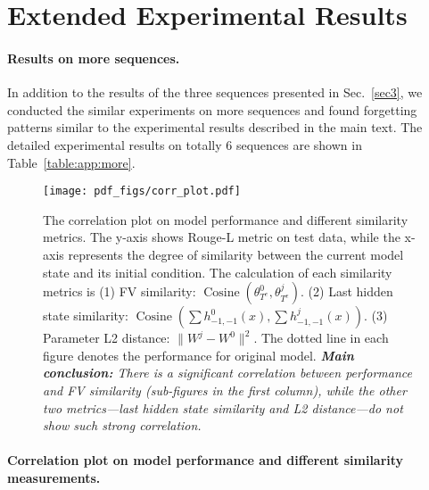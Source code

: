 
\section{Extended Experimental Results}


\paragraph{Results on more sequences.}
\label{app:more_seq} 
In addition to the results of the three sequences presented in Sec.~\ref{sec3}, we conducted the similar experiments on more sequences and found forgetting patterns similar to the experimental results described in the main text. The detailed experimental results on totally 6 sequences are shown in Table~\ref{table:app:more}.

\begin{figure*}[!t]
  \centering
  \texttt{[image: pdf\_figs/corr\_plot.pdf]}
  \vspace{-1.1em}
  \caption{ The correlation plot on model performance and different similarity metrics. The y-axis shows Rouge-L metric on test data, while the x-axis represents the degree of similarity between the current model state and its initial condition. The calculation of each similarity metrics is (1) FV similarity: \(\operatorname{Cosine}(\theta_{T^e}^0, \theta_{T^e}^j)\). (2) Last hidden state similarity: \(\operatorname{Cosine}(\sum h^0_{-1,-1}(x), \sum h^j_{-1,-1}(x))\). (3) Parameter L2 distance: \(\|W^j - W^0\|^2\). The dotted line in each figure denotes the performance for original model. \textit{\textbf{Main conclusion:} There is a significant correlation between performance and FV similarity (sub-figures in the first column), while the other two metrics—last hidden state similarity and L2 distance—do not show such strong correlation.}}
  \label{fig:app:corr}
  \vspace{-0.1em}
\end{figure*}



\paragraph{Correlation plot on model performance and different similarity measurements.}

